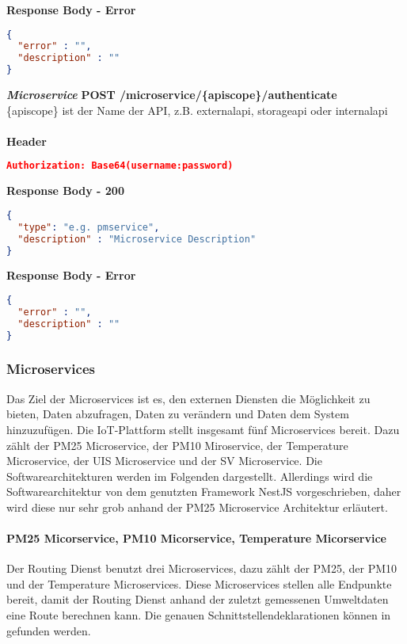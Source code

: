 \textbf{Response Body - Error}
\begin{lstlisting}[language=json,firstnumber=1,basicstyle=\footnotesize]
{
  "error" : "",
  "description" : ""
}
\end{lstlisting}

\textit{\textbf{Microservice}}
\newline
\textbf{POST /microservice/\{apiscope\}/authenticate} 
\\\{apiscope\} ist der Name der API, z.B. externalapi, storageapi oder internalapi
\\\\
\textbf{Header}
\begin{lstlisting}[language=json,firstnumber=1,basicstyle=\footnotesize]
Authorization: Base64(username:password)
\end{lstlisting}

\textbf{Response Body - 200}
\begin{lstlisting}[language=json,firstnumber=1,basicstyle=\footnotesize]
{
  "type": "e.g. pmservice",
  "description" : "Microservice Description"
}
\end{lstlisting}

\textbf{Response Body - Error}
\begin{lstlisting}[language=json,firstnumber=1,basicstyle=\footnotesize]
{
  "error" : "",
  "description" : ""
}
\end{lstlisting}

\subsubsection{Microservices}
\label{sec:arch:iot:ms}
Das Ziel der Microservices ist es, den externen Diensten die Möglichkeit zu bieten, Daten abzufragen, Daten zu verändern und Daten dem System hinzuzufügen.
Die IoT-Plattform stellt insgesamt fünf Microservices bereit.
Dazu zählt der PM25 Microservice, der PM10 Miroservice, der Temperature Microservice, der UIS Microservice und der SV Microservice.
Die Softwarearchitekturen werden im Folgenden dargestellt.
Allerdings wird die Softwarearchitektur von dem genutzten Framework NestJS vorgeschrieben, daher wird diese nur sehr grob anhand der PM25 Microservice Architektur erläutert.
\newline

\paragraph{PM25 Micorservice, PM10 Micorservice, Temperature Micorservice} 
Der Routing Dienst benutzt drei Microservices, dazu zählt der PM25, der PM10 und der Temperature Microservices.
Diese Microservices stellen alle Endpunkte bereit, damit der Routing Dienst anhand der zuletzt gemessenen Umweltdaten eine Route berechnen kann.
Die genauen Schnittstellendeklarationen können in  gefunden werden.



